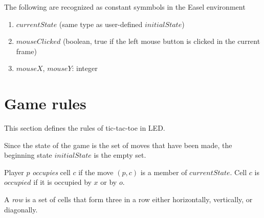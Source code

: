 \documentclass{../src/led_doc}
\begin{document}
\begin{ledCmnt}
The following are recognized as constant symmbols in the Easel environment
\begin{enumerate}
\item $currentState$ (same type as user-defined $initialState$)
\item $mouseClicked$ (boolean, true if the left mouse button is clicked in the current frame)
\item $mouseX$, $mouseY$: integer
\end{enumerate}

\section{Game rules}


This section defines the rules of tic-tac-toe in LED.

Since the state of the game is the set of moves that have been made,
the beginning state $initialState$ is the empty set.
\end{ledCmnt}

\begin{ledDef}
\end{ledDef}

\begin{ledCmnt}
Player $p$ {\em occupies} cell $c$ if the move $(p,c)$ is a member of $currentState$.
Cell $c$ is $occupied$ if it is occupied by $x$ or by $o$.
\end{ledCmnt}

\begin{ledDef}
\end{ledDef}

\begin{ledDef}
\end{ledDef}

\begin{ledCmnt}
A {\em row} is a set of cells that form three in a row either horizontally, vertically, or diagonally.
\end{ledCmnt}

\begin{ledDef}
\end{ledDef}
\end{document}

